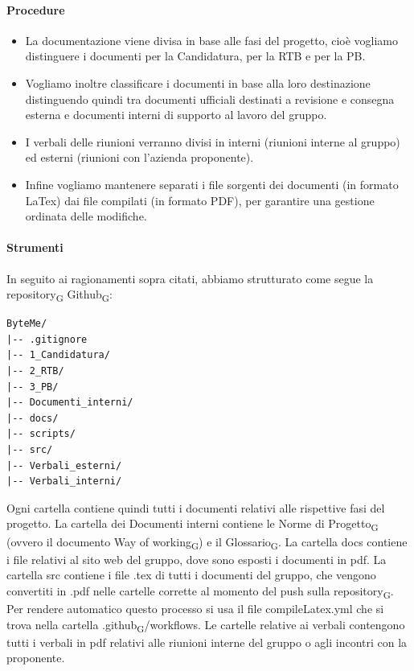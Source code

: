 \documentclass[11pt,a4paper]{article}
\newcommand{\gls}[1]{#1\textsubscript{G}}
\begin{document}
\paragraph{Procedure}
\begin{itemize}
    \item La documentazione viene divisa in base alle fasi del progetto, cioè vogliamo distinguere i documenti per la Candidatura, per la RTB e per la PB.
    \item Vogliamo inoltre classificare i documenti in base alla loro destinazione distinguendo quindi tra documenti ufficiali destinati a revisione e consegna esterna e documenti interni di supporto al lavoro del gruppo.
    \item I verbali delle riunioni verranno divisi in interni (riunioni interne al gruppo) ed esterni (riunioni con l'azienda proponente).
    \item Infine vogliamo mantenere separati i file sorgenti dei documenti (in formato LaTex) dai file compilati (in formato PDF), per garantire una gestione ordinata delle modifiche.
\end{itemize}

\paragraph{Strumenti}
In seguito ai ragionamenti sopra citati, abbiamo strutturato come segue la \gls{repository} \gls{Github}:
\begin{verbatim}
ByteMe/
|-- .gitignore
|-- 1_Candidatura/
|-- 2_RTB/
|-- 3_PB/
|-- Documenti_interni/
|-- docs/
|-- scripts/
|-- src/
|-- Verbali_esterni/
|-- Verbali_interni/
\end{verbatim}

Ogni cartella contiene quindi tutti i documenti relativi alle rispettive fasi del progetto.
La cartella dei Documenti interni contiene le \gls{Norme di Progetto} (ovvero il documento \gls{Way of working}) e il \gls{Glossario}.
La cartella docs contiene i file relativi al sito web del gruppo, dove sono esposti i documenti in pdf.
La cartella src contiene i file .tex di tutti i documenti del gruppo, che vengono convertiti in .pdf nelle cartelle corrette al momento del push sulla \gls{repository}. Per rendere automatico questo processo si usa il file compileLatex.yml che si trova nella cartella .\gls{github}/workflows.
Le cartelle relative ai verbali contengono tutti i verbali in pdf relativi alle riunioni interne del gruppo o agli incontri con la proponente.
\end{document}
